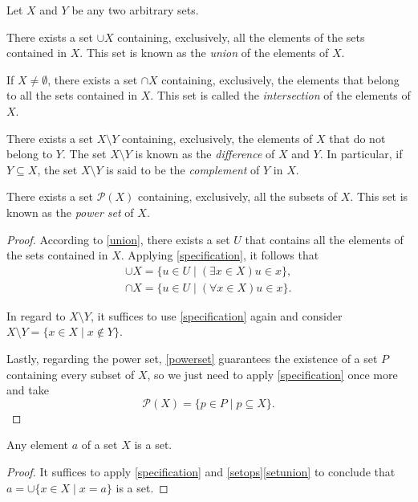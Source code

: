\begin{para}
\label{setops}
Let $X$ and $Y$ be any two arbitrary sets.
\begin{statements}
\item \label{setunion} There exists a set $\cup X$ containing, exclusively, all the elements of the sets contained in $X$. This set is known as the \emph{union} of the elements of $X$.
\item If $X\neq\emptyset$, there exists a set $\cap X$ containing, exclusively, the elements that belong to all the sets contained in $X$. This set is called the \emph{intersection} of the elements of $X$.
\item There exists a set $X\setminus Y$ containing, exclusively, the elements of $X$ that do not belong to $Y$. The set $X\setminus Y$ is known as the \emph{difference} of $X$ and $Y$. In particular, if $Y\subseteq X$, the set $X\setminus Y$ is said to be the \emph{complement} of $Y$ in $X$.
\item There exists a set $\mathcal{P}(X)$ containing, exclusively, all the subsets of $X$. This set is known as the \emph{power set} of $X$.
\end{statements}
\label{<+label+>}
\end{para}

\begin{proof}
According to \ref{union}, there exists a set $U$ that contains all the elements of the sets contained in $X$. Applying \ref{specification}, it follows that
\begin{gather*}
\cup X = \{u \in U \mid (\exists x \in X) u \in x\},\\
\cap X = \{u \in U \mid (\forall x \in X) u \in x\}.
\end{gather*}

In regard to $X\setminus Y$, it suffices to use \ref{specification} again and consider $X\setminus Y = \{x\in X \mid x\not\in Y\}$.

Lastly, regarding the power set, \ref{powerset} guarantees the existence of a set $P$ containing every subset of $X$, so we just need to apply \ref{specification} once more and take
\[\mathcal{P}(X) = \{p \in P \mid p \subseteq X\}.\]
\end{proof}

\begin{proposition}
Any element $a$ of a set $X$ is a set.
\label{elisset}
\end{proposition}

\begin{proof}
It suffices to apply \ref{specification} and \ref{setops}\ref{setunion} to conclude that $a = \cup \{x \in X \mid x = a\}$ is a set.
\end{proof}

